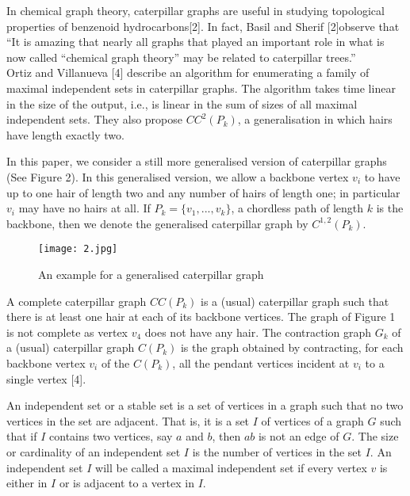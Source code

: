 \documentclass[10pt]{article}
\begin{document}
In chemical graph theory, caterpillar graphs are useful in studying 
topological properties of benzenoid hydrocarbons[2]. In fact, Basil and
Sherif [2]observe that\\


``It is amazing that nearly all graphs that played an important role in
what is now called ``chemical graph theory'' may be related to
caterpillar trees.'' \\


Ortiz and Villanueva [4] describe an algorithm for enumerating a family
of maximal independent sets in caterpillar graphs. The algorithm takes
time linear in the size of the output, i.e., is linear in the sum of
sizes of all maximal independent sets.  They also propose $CC^2(P_k)$, a
generalisation in which hairs have length exactly two. 

In this paper, we consider a still more generalised version of
caterpillar graphs (See Figure 2).  In this generalised version, we allow
a backbone vertex $v_i$ to have up to one hair of length two and any
number of hairs of length one; in particular $v_i$ may have no hairs at
all.  If $P_k=\{v_1,... ,v_k\}$, a chordless path of length $k$ is the
backbone, then we denote the generalised caterpillar graph by
$C^{1,2}(P_k)$.

\begin{figure}[h]
\centering 
\texttt{[image: 2.jpg]} 
\caption{An example for a generalised caterpillar graph}
\end{figure} 

A complete caterpillar graph $CC(P_k)$ is a (usual) caterpillar graph
such that there is at least one hair at each of its backbone vertices.
The graph of Figure 1 is not complete as vertex $v_4$ does not have any
hair. The contraction graph $G_k$ of a (usual) caterpillar graph $C(P_k)$
is the graph obtained by contracting, for each backbone vertex $v_i$ of
the $C(P_k)$, all the pendant vertices incident at $v_i$ to a single
vertex [4].

An independent set or a stable set is a set of vertices in a graph such
that no two vertices in the set are adjacent. That is, it is a set $I$ of
vertices of a graph $G$ such that if $I$ contains two vertices, say $a$
and $b$, then $ab$ is not an edge of $G$. The size or cardinality of an
independent set $I$ is the number of vertices in the set $I$. An
independent set $I$ will be called a maximal independent set if every
vertex $v$ is either in $I$ or is adjacent to a vertex in $I$.
\end{document}
